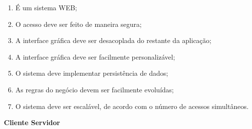\documentclass[12pt]{article}
\begin{document}
\begin{enumerate}
\item É um sistema WEB;
\item O acesso deve ser feito de maneira segura;
\item A interface gráfica deve ser desacoplada do restante da aplicação;
\item A interface gráfica deve ser facilmente personalizável;
\item  O sistema deve implementar persistência de dados;
\item As regras do negócio devem ser facilmente evoluídas;
\item	 O sistema deve ser escalável, de acordo com o número de acessos simultâneos.
\end{enumerate}

\textbf{Cliente Servidor}
\end{document}
